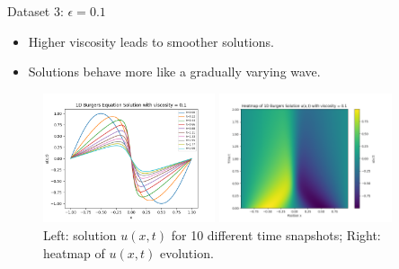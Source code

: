 \begin{secframe}

\begin{block}{Dataset 3: $\epsilon = 0.1$}
\begin{itemize}
  \item \small Higher viscosity leads to smoother solutions.
  \item \small Solutions behave more like a gradually varying wave.
\end{itemize}
\end{block}

\begin{figure}[h!]
    \centering
    \begin{minipage}[t]{0.48\linewidth}
        \centering
        \includegraphics[height=3.8cm]{images/graphical_visualization_1DBurgers_visc_01.png}
    \end{minipage}\hfill
    \begin{minipage}[t]{0.48\linewidth}
        \centering
        \includegraphics[height=3.8cm]{images/Heatmap_1DBurgers_visc_01.png}
    \end{minipage}
    \caption{\scriptsize Left: solution $u(x,t)$ for 10 different time snapshots; Right: heatmap of $u(x,t)$ evolution.}
\end{figure}

\end{secframe}

